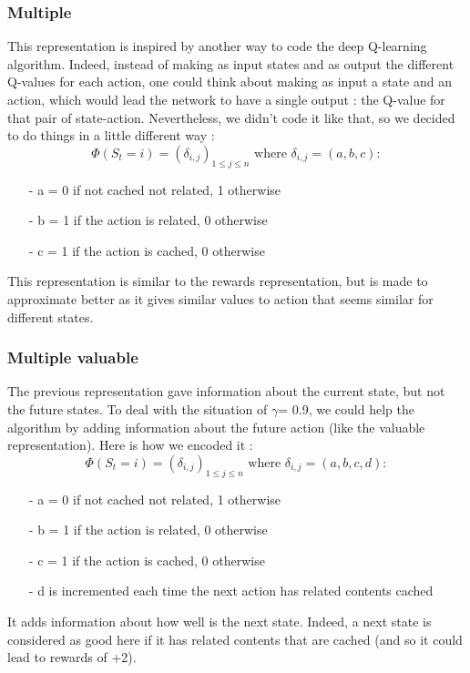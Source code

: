 \documentclass[a4paper]{article}
\begin{document}
\subsubsection{Multiple} This representation is inspired by another way to code the deep Q-learning algorithm. Indeed, instead of making as input states and as output the different Q-values for each action, one could think about making as input a state and an action, which would lead the network to have a single output : the Q-value for that pair of state-action. Nevertheless, we didn't code it like that, so we decided to do things in a little different way : \\
$$  \Phi(S_t = i ) = (\delta_{i,j})_{1 \le j \le n  } \text{ where } \delta_{i,j} = (a,b,c) : $$ 
\begin{enumerate}
    \item[-] a = 0 if not cached not related, 1 otherwise
    \item[-] b = 1 if the action is related, 0 otherwise
    \item[-] c = 1 if the action is cached, 0 otherwise
\end{enumerate}

This representation is similar to the rewards representation, but is made to approximate better as it gives similar values to action that seems similar for different states.

\subsubsection{Multiple valuable} 
The previous representation gave information about the current state, but not the future states. To deal with the situation of $\gamma $= 0.9, we could help the algorithm by adding information about the future action (like the valuable representation). Here is how we encoded it : 
$$  \Phi(S_t = i ) = (\delta_{i,j})_{1 \le j \le n  } \text{ where } \delta_{i,j} = (a,b,c,d) : $$ 
\begin{enumerate}
    \item[-] a = 0 if not cached not related, 1 otherwise
    \item[-] b = 1 if the action is related, 0 otherwise
    \item[-] c = 1 if the action is cached, 0 otherwise
    \item[-] d is incremented each time the next action has related contents cached
\end{enumerate}

It adds information about how well is the next state. Indeed, a next state is considered as good here if it has related contents that are cached (and so it could lead to rewards of +2).
\end{document}
